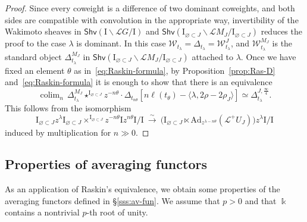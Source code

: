 \documentclass[11pt]{amsart}
\numberwithin{equation}{section}
\theoremstyle{plain}
\theoremstyle{definition}
\newcommand{\F}{{\mathbb F}}
\newcommand{\I}{{\mathrm I}}
\renewcommand{\k}{\Bbbk}
\newcommand{\K}{{\mathbb K}}
\newcommand{\sL}{{\mathcal L}}
\newcommand{\sW}{{\mathcal W}}
\newcommand{\xs}{{\ \xrightarrow{\sim}\ }}
\newcommand{\Ad}{\mathrm{Ad}}
\newcommand{\quar}{{{\frac{\infty}{4}}}}
\newcommand{\Shv}{\mathsf{Shv}}
\newcommand{\Fl}{\mathrm{Fl}}
\DeclareMathOperator*{\colim}{colim}
\begin{document}
\begin{proof}
Since every coweight is a difference of two dominant coweights, and both sides are compatible with convolution in the appropriate way, invertibility of the Wakimoto sheaves in $\Shv(\I\backslash \sL{G}/\I)$ and $\Shv(\I_{\varnothing \subset J}\backslash \sL{M}_J/\I_{\varnothing \subset J})$ reduces the proof to the case $\lambda$ is dominant.
In this case $\sW_{t_\lambda}=\Delta_{t_\lambda}=\sW_{t_\lambda}^J$, and $\sW^{M_J}_{t_\lambda}$ is the standard object $\Delta^{M_J}_{t_\lambda}$ in $\Shv(\I_{\varnothing \subset J}\backslash \sL{M}_J/\I_{\varnothing \subset J})$ attached to $\lambda$. 
Once we have fixed an element $\theta$ as in~\eqref{eq:Raskin-formula},
by Proposition~\ref{prop:Ras-D} and~\eqref{eq:Raskin-formula} it is enough to show that there is an equivalence 
\[
\colim_{n} \, \Delta^{M_J}_{t_\lambda} \star^{\I_{\varnothing \subset J}} z^{-n\theta} \cdot \Delta_{t_{n\theta}} [n\ell(t_\theta) -\langle \lambda, 2\rho-2\rho_J \rangle] \simeq \Delta^{J,\quar}_{t_\lambda} . 
\]
This follows from the isomorphism
\[
 \I_{\varnothing \subset J}z^\lambda \I_{\varnothing \subset J} \times^{\I_{\varnothing \subset J}} z^{-n\theta} \I z^{n\theta}\I/\I 
\xs \big(\I_{\varnothing \subset J}\ltimes \Ad_{z^{\lambda-n\theta}}(\sL^+U_{J})\big) z^{\lambda} \I/\I
\]
induced by multiplication for $n \gg 0$.
\end{proof}

\subsection{Properties of averaging functors} 
\label{sss:prop-av}

As an application of Raskin's equivalence, we obtain some properties of the averaging functors defined in \S\ref{sss:av-fun}. We assume that $p>0$ and that $\k$ contains a nontrivial $p$-th root of unity.
\end{document}
